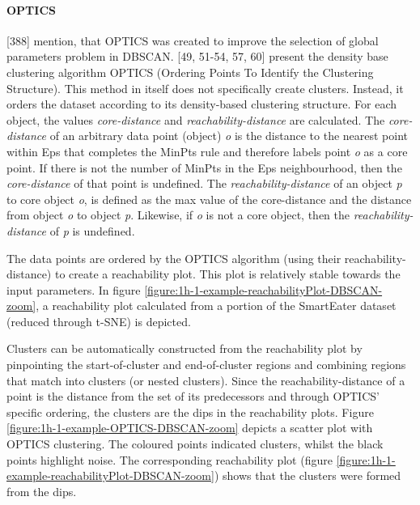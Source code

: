 \paragraph{OPTICS}
\label{section:OPTICS}
\textcite{han2011data}[388] mention, that OPTICS was created to improve the selection of global parameters problem in DBSCAN.
\textcite{OPTICS}[49, 51-54, 57, 60] present the density base clustering algorithm OPTICS (Ordering Points To Identify the Clustering Structure). This method in itself does not specifically create clusters. Instead, it orders the dataset according to its density-based clustering structure. For each object, the values \textit{core-distance} and \textit{reachability-distance} are calculated. The \textit{core-distance} of an arbitrary data point (object) \textit{o} is the distance to the nearest point within Eps that completes the MinPts rule and therefore labels point \textit{o} as a core point. If there is not the number of MinPts in the Eps neighbourhood, then the \textit{core-distance} of that point is undefined. The \textit{reachability-distance} of an object \textit{p} to core object \textit{o}, is defined as the max value of the core-distance and the distance from object \textit{o} to object \textit{p}. Likewise, if \textit{o} is not a core object, then the \textit{reachability-distance} of \textit{p} is undefined. 


The data points are ordered by the OPTICS algorithm (using their reachability-distance) to create a reachability plot. This plot is relatively stable towards the input parameters. In figure \ref{figure:1h-1-example-reachabilityPlot-DBSCAN-zoom}, a reachability plot calculated from a portion of the SmartEater dataset (reduced through t-SNE) is depicted. 


Clusters can be automatically constructed from the reachability plot by pinpointing the start-of-cluster and end-of-cluster regions and combining regions that match into clusters (or nested clusters). Since the reachability-distance of a point is the distance from the set of its predecessors and through OPTICS' specific ordering, the clusters are the dips in the reachability plots. Figure \ref{figure:1h-1-example-OPTICS-DBSCAN-zoom} depicts a scatter plot with OPTICS clustering. The coloured points indicated clusters, whilst the black points highlight noise. The corresponding reachability plot (figure \ref{figure:1h-1-example-reachabilityPlot-DBSCAN-zoom}) shows that the clusters were formed from the dips.


